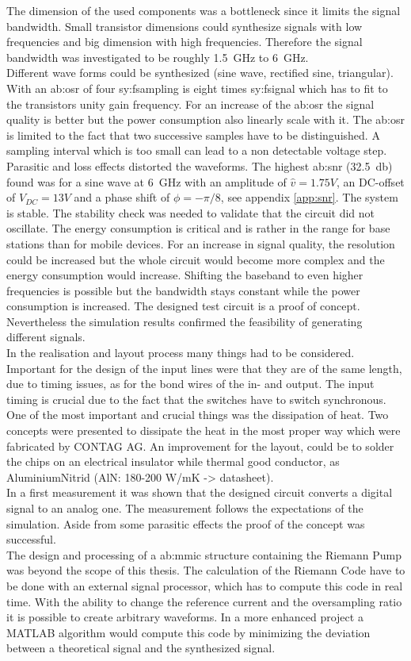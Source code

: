 The dimension of the used components was a bottleneck since it limits the signal bandwidth.
Small transistor dimensions could synthesize signals with low frequencies and big dimension with high frequencies.
Therefore the signal bandwidth was investigated to be roughly \SI{1.5}{\GHz} to \SI{6}{\GHz}.\\
Different wave forms could be synthesized (sine wave, rectified sine, triangular).
With an \gls{ab:osr} of four \gls{sy:fsampling} is eight times \gls{sy:fsignal} which has to fit to the transistors unity gain frequency.
For an increase of the \gls{ab:osr} the signal quality is better but the power consumption also linearly scale with it.
The \gls{ab:osr} is limited to the fact that two successive samples have to be distinguished.
A sampling interval which is too small can lead to a non detectable voltage step.\\
Parasitic and loss effects distorted the waveforms.
The highest \gls{ab:snr} (\SI{32.5}{\decibel}) found was for a sine wave at \SI{6}{\giga \hertz} with an amplitude of $\hat{v} = 1.75 V$, an DC-offset of $V_{DC} = 13 V$ and a phase shift of $\phi = -\pi/8$, see appendix \ref{app:snr}.
The system is stable.
The stability check was needed to validate that the circuit did not oscillate.
The energy consumption is critical and is rather in the range for base stations than for mobile devices.
For an increase in signal quality, the resolution could be increased but the whole circuit would become more complex and the energy consumption would increase.
Shifting the baseband to even higher frequencies is possible but the bandwidth stays constant while the power consumption is increased.
The designed test circuit is a proof of concept.
Nevertheless the simulation results confirmed the feasibility of generating different signals.\\
In the realisation and layout process many things had to be considered.
Important for the design of the input lines were that they are of the same length, due to timing issues, as for the bond wires of the in- and output.
The input timing is crucial due to the fact that the switches have to switch synchronous.
One of the most important and crucial things was the dissipation of heat.
Two concepts were presented to dissipate the heat in the most proper way which were fabricated by CONTAG AG.
An improvement for the layout, could be to solder the chips on an electrical insulator while thermal good conductor, as AluminiumNitrid (AlN: 180-200 W/mK -> datasheet).\\
In a first measurement it was shown that the designed circuit converts a digital signal to an analog one.
The measurement follows the expectations of the simulation.
Aside from some parasitic effects the proof of the concept was successful.\\
The design and processing of a \gls{ab:mmic} structure containing the Riemann Pump was beyond the scope of this thesis.
The calculation of the Riemann Code have to be done with an external signal processor, which has to compute this code in real time. 
With the ability to change the reference current and the oversampling ratio it is possible to create arbitrary waveforms. 
In a more enhanced project a MATLAB algorithm would compute this code by minimizing the deviation between a theoretical signal and the synthesized signal.
